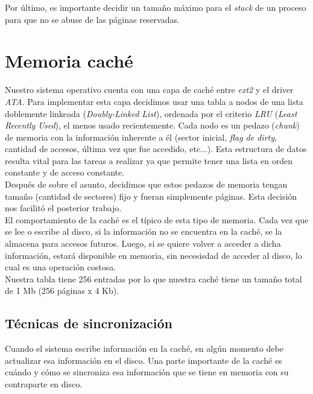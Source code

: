 \documentclass[a4paper,10pt]{article}
\begin{document}
Por último, es importante decidir un tamaño máximo para el \textit{stack} de un proceso para que no se abuse de las páginas 
reservadas.

\newpage

\section{Memoria caché}

Nuestro sistema operativo cuenta con una capa de caché entre \textit{ext2} y el driver \textit{ATA}. Para implementar esta capa decidimos usar una tabla 
a nodos de una lista doblemente linkeada (\textit{Doubly-Linked List}), ordenada por el criterio \textit{LRU} (\textit{Least Recently Used}), el menos usado
 recientemente. Cada nodo es un pedazo (\textit{chunk}) de memoria con la información inherente a él (sector inicial, \textit{flag de dirty}, 
cantidad de accesos, última vez que fue accedido, etc...). Esta estructura de datos resulta vital para las tareas a realizar ya que permite tener una lista
en orden constante y de acceso constante.\\

Después de sobre el asunto, decidimos que estos pedazos de memoria tengan tamaño (cantidad de sectores)
fijo y fueran simplemente páginas. Esta decisión nos facilitó el posterior trabajo.\\

El comportamiento de la caché es el típico de esta tipo de memoria. Cada vez que se lee o escribe al disco, si la información no se encuentra en la caché, se
 la almacena para accesos futuros. Luego, si se quiere volver a acceder a dicha información, estará disponible en memoria, sin necesisdad de acceder al disco, lo 
cual es una operación costosa.\\


Nuestra tabla tiene 256 entradas por lo que nuestra caché tiene un tamaño total de 1 Mb (256 páginas x 4 Kb).\\

\subsection{Técnicas de sincronización}

Cuando el sistema escribe información en la caché, en algún momento debe actualizar esa información en el disco. Una parte importante de la caché es cuándo y
 cómo se sincroniza esa información que se tiene en memoria con su contraparte en disco. \\
\end{document}
